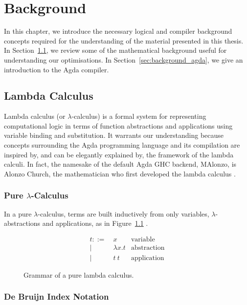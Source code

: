 \chapter{Background}
\label{cha:background}

In this chapter, we introduce the necessary logical and compiler background concepts required for the understanding of the material presented in this thesis. In Section~\ref{sec:lambda_calc}, we review some of the mathematical background useful for understanding our optimisations. In Section~\ref{sec:background_agda}, we give an introduction to the Agda compiler.

\section{Lambda Calculus}
\label{sec:lambda_calc}

Lambda calculus (or $\lambda$-calculus) is a formal system for representing computational logic in terms of function abstractions and applications using variable binding and substitution. It warrants our understanding because concepts surrounding the Agda programming language and its compilation are inspired by, and can be elegantly explained by, the framework of the lambda calculi. In fact, the namesake of the default Agda GHC backend, MAlonzo, is Alonzo Church, the mathematician who first developed the lambda calculus \citep{fokkinga1987}.

\subsection{Pure $\lambda$-Calculus}

In a pure $\lambda$-calculus, terms are built inductively from only variables, $\lambda$-abstractions and applications, as in Figure~\ref{fig:lambda_calc} \citep{kozen1997}.

\begin{figure}[h]
\begin{align*}
t ::=~& x               & \text{variable}\\
    |~& \lambda x . t   & \text{abstraction}\\
    |~& t~t             & \text{application}
\end{align*}
\caption{Grammar of a pure lambda calculus.}
\label{fig:lambda_calc}
\end{figure}

\subsection{De Bruijn Index Notation}

